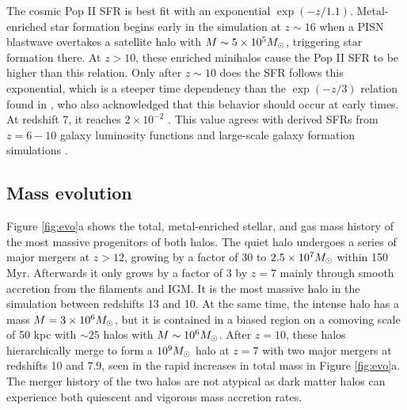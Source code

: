 \documentclass[apjl]{emulateapj}
\begin{document}
The cosmic Pop II SFR is best fit with an exponential $\exp(-z/1.1)$.
Metal-enriched star formation begins early in the simulation at $z
\sim 16$ when a PISN blastwave overtakes a satellite halo with $M \sim
5 \times 10^5 \Ms$, triggering star formation there.  At $z>10$, these
enriched minihalos cause the Pop II SFR to be higher than this
relation.  Only after $z \sim 10$ does the SFR follows this
exponential, which is a steeper time dependency than the $\exp(-z/3)$
relation found in \citet{Hernquist03}, who also acknowledged that this
behavior should occur at early times.  At redshift 7, it reaches $2
\times 10^{-2}$ \sfr.  This value agrees with derived SFRs from
$z=6-10$ galaxy luminosity functions \citep[e.g.][]{Bouwens11} and
large-scale galaxy formation simulations \citep[e.g.][]{Schaye10}.

\subsection{Mass evolution}
\label{sec:halo}



\begin{figure*}
\caption{\label{fig:evo} (a) Evolution of the total halo mass (top),
  stellar mass (middle), and gas fraction (bottom) of the quiet
  (dashed) and intense (solid) halos.  In the top panel, the filtering
  halo mass is plotted as the thick black line (overlapping with the
  quiet halo after $z=9$.  (b) Mass-weighted stellar metallicities and
  gas metallicities enriched by Pop II and Pop III SNe of the intense
  (top) and quiet (bottom) halos.}
\end{figure*}


Figure \ref{fig:evo}a shows the total, metal-enriched stellar, and gas
mass history of the most massive progenitors of both halos.  The quiet
halo undergoes a series of major mergers at $z > 12$, growing by a
factor of 30 to $2.5 \times 10^7 \Ms$ within 150 Myr.  Afterwards it
only grows by a factor of 3 by $z=7$ mainly through smooth accretion
from the filaments and IGM.  It is the most massive halo in the
simulation between redshifts 13 and 10.  At the same time, the intense
halo has a mass $M = 3 \times 10^6 \Ms$, but it is contained in a
biased region on a comoving scale of 50 kpc with $\sim25$ halos with
$M \sim 10^6 \Ms$.  After $z=10$, these halos hierarchically merge to
form a $10^9 \Ms$ halo at $z=7$ with two major mergers at redshifts 10
and 7.9, seen in the rapid increases in total mass in Figure
\ref{fig:evo}a.  The merger history of the two halos are not atypical
as dark matter halos can experience both quiescent and vigorous mass
accretion rates.
\end{document}
